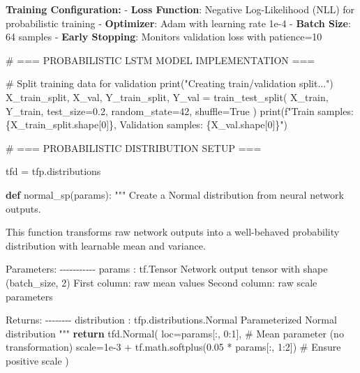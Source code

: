 \documentclass[
  letterpaper,
  DIV=11,
  numbers=noendperiod]{scrreprt}
\newenvironment{Shaded}{\begin{snugshade}}{\end{snugshade}}
\newcommand{\BuiltInTok}[1]{\textcolor[rgb]{0.00,0.23,0.31}{#1}}
\newcommand{\CommentTok}[1]{\textcolor[rgb]{0.37,0.37,0.37}{#1}}
\newcommand{\ControlFlowTok}[1]{\textcolor[rgb]{0.00,0.23,0.31}{\textbf{#1}}}
\newcommand{\DecValTok}[1]{\textcolor[rgb]{0.68,0.00,0.00}{#1}}
\newcommand{\FloatTok}[1]{\textcolor[rgb]{0.68,0.00,0.00}{#1}}
\newcommand{\KeywordTok}[1]{\textcolor[rgb]{0.00,0.23,0.31}{\textbf{#1}}}
\newcommand{\NormalTok}[1]{\textcolor[rgb]{0.00,0.23,0.31}{#1}}
\newcommand{\OperatorTok}[1]{\textcolor[rgb]{0.37,0.37,0.37}{#1}}
\newcommand{\SpecialCharTok}[1]{\textcolor[rgb]{0.37,0.37,0.37}{#1}}
\newcommand{\SpecialStringTok}[1]{\textcolor[rgb]{0.13,0.47,0.30}{#1}}
\newcommand{\StringTok}[1]{\textcolor[rgb]{0.13,0.47,0.30}{#1}}
\newcommand{\VariableTok}[1]{\textcolor[rgb]{0.07,0.07,0.07}{#1}}
\begin{document}
\textbf{Training Configuration:} - \textbf{Loss Function}: Negative
Log-Likelihood (NLL) for probabilistic training - \textbf{Optimizer}:
Adam with learning rate 1e-4 - \textbf{Batch Size}: 64 samples -
\textbf{Early Stopping}: Monitors validation loss with patience=10

\begin{Shaded}
\begin{Highlighting}[]
\CommentTok{\# === PROBABILISTIC LSTM MODEL IMPLEMENTATION ===}

\CommentTok{\# Split training data for validation}
\BuiltInTok{print}\NormalTok{(}\StringTok{"Creating train/validation split..."}\NormalTok{)}
\NormalTok{X\_train\_split, X\_val, Y\_train\_split, Y\_val }\OperatorTok{=}\NormalTok{ train\_test\_split(}
\NormalTok{    X\_train, Y\_train,}
\NormalTok{    test\_size}\OperatorTok{=}\FloatTok{0.2}\NormalTok{,}
\NormalTok{    random\_state}\OperatorTok{=}\DecValTok{42}\NormalTok{,}
\NormalTok{    shuffle}\OperatorTok{=}\VariableTok{True}
\NormalTok{)}
\BuiltInTok{print}\NormalTok{(}\SpecialStringTok{f"Train samples: }\SpecialCharTok{\{}\NormalTok{X\_train\_split}\SpecialCharTok{.}\NormalTok{shape[}\DecValTok{0}\NormalTok{]}\SpecialCharTok{\}}\SpecialStringTok{, Validation samples: }\SpecialCharTok{\{}\NormalTok{X\_val}\SpecialCharTok{.}\NormalTok{shape[}\DecValTok{0}\NormalTok{]}\SpecialCharTok{\}}\SpecialStringTok{"}\NormalTok{)}

\CommentTok{\# === PROBABILISTIC DISTRIBUTION SETUP ===}

\NormalTok{tfd }\OperatorTok{=}\NormalTok{ tfp.distributions}

\KeywordTok{def}\NormalTok{ normal\_sp(params):}
    \CommentTok{"""}
\CommentTok{    Create a Normal distribution from neural network outputs.}

\CommentTok{    This function transforms raw network outputs into a well{-}behaved}
\CommentTok{    probability distribution with learnable mean and variance.}

\CommentTok{    Parameters:}
\CommentTok{    {-}{-}{-}{-}{-}{-}{-}{-}{-}{-}{-}}
\CommentTok{    params : tf.Tensor}
\CommentTok{        Network output tensor with shape (batch\_size, 2)}
\CommentTok{        First column: raw mean values}
\CommentTok{        Second column: raw scale parameters}

\CommentTok{    Returns:}
\CommentTok{    {-}{-}{-}{-}{-}{-}{-}{-}}
\CommentTok{    distribution : tfp.distributions.Normal}
\CommentTok{        Parameterized Normal distribution}
\CommentTok{    """}
    \ControlFlowTok{return}\NormalTok{ tfd.Normal(}
\NormalTok{        loc}\OperatorTok{=}\NormalTok{params[:, }\DecValTok{0}\NormalTok{:}\DecValTok{1}\NormalTok{],  }\CommentTok{\# Mean parameter (no transformation)}
\NormalTok{        scale}\OperatorTok{=}\FloatTok{1e{-}3} \OperatorTok{+}\NormalTok{ tf.math.softplus(}\FloatTok{0.05} \OperatorTok{*}\NormalTok{ params[:, }\DecValTok{1}\NormalTok{:}\DecValTok{2}\NormalTok{])  }\CommentTok{\# Ensure positive scale}
\NormalTok{    )}


\end{Highlighting}
\end{Shaded}
\end{document}
